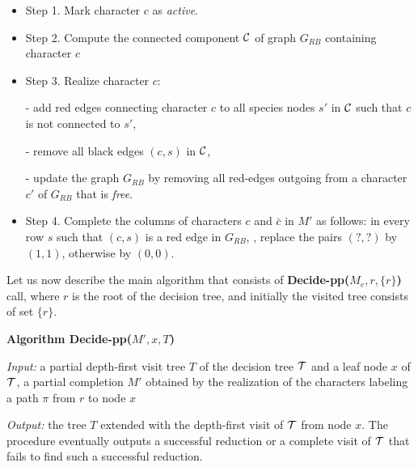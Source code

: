 \documentclass{llncs}
\newcommand{\pp}{Decide-pp}
\newcommand{\grb}{$G_{RB}$ }
\newcommand{\grbc}{$G_{RB}$, }
\begin{document}
\begin{itemize}

\item Step 1.  Mark character $c$ as {\em active}.
\item Step 2.  Compute the connected component $\cal C$ of graph \grb containing character $c$
\item Step 3.  Realize character $c$:

- add red edges connecting character $c$ to all  species nodes $s'$  in $\cal C$ such that $c$ is not connected to $s'$,

	- remove all black edges $(c, s)$ in $\cal C$,
	
	- update the graph \grb by removing all red-edges outgoing  from a character $c'$ of \grb that is {\em free}.
 
	
\item Step 4.  Complete the  columns of characters $c$ and $\bar{c}$ in $M'$   as follows:   in every row $s$ such that $(c,s)$ is a red edge in \grbc,  replace   the  pairs $(?,?)$ by $(1,1)$,  otherwise     by $(0,0)$.





\end{itemize}







Let us now describe the main algorithm that consists of 
 {\bf \pp ($M_e, r, \{r\}$)} call, where $r$ is the root of the decision tree,  and initially the visited tree consists of set $\{r\}$.


 








{\bf Algorithm \pp($M', x,T$)}

 {\em Input:}  a partial depth-first visit tree $T$ of the decision tree $\cal T$ and a leaf  node $x$ of ${\cal T}$,  a partial completion $M'$  obtained by the realization of  the  characters labeling a path $\pi$ from $r$ to node $x$

 {\em Output:} the tree $T$ extended with the depth-first visit of $\cal T$  from  node $x$.
The procedure eventually outputs a successful reduction or a complete visit of $\cal T$ that fails to find such a successful reduction.
\end{document}
